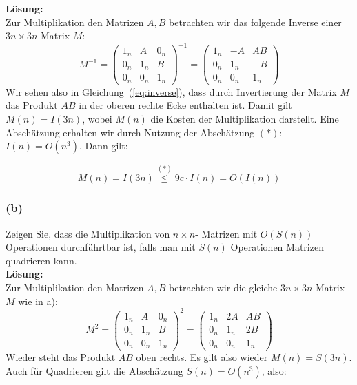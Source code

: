 \documentclass[11pt,a4paper,ngerman]{article}
\begin{document}
\textbf{Lösung:}\\
Zur Multiplikation den Matrizen $A,B$ betrachten wir das folgende Inverse einer $3n \times 3n$-Matrix $M$:
\begin{equation}\label{eq:inverse}
  M^{-1} = \left(\begin{array}{ccc}
              1_n & A   & 0_n \\
              0_n & 1_n & B \\
              0_n & 0_n & 1_n
           \end{array}\right)^{-1}
         = \left(\begin{array}{ccc}
              1_n & -A   & AB \\
              0_n & 1_n & -B \\
              0_n & 0_n & 1_n
           \end{array}\right)
\end{equation}
Wir sehen also in Gleichung~(\ref{eq:inverse}), dass durch Invertierung der Matrix $M$ das Produkt $AB$
in der oberen rechte Ecke enthalten ist. Damit gilt $M(n) = I(3n)$, wobei $M(n)$ die Kosten der Multiplikation
darstellt.
Eine Abschätzung erhalten wir durch Nutzung der Abschätzung $(*)$: $I(n) = O(n^3)$. Dann gilt:

\begin{equation}
  M(n) = I(3n) \stackrel{(*)}{\leq} 9c\cdot I(n) = O(I(n))
\end{equation}
\subsubsection*{(b)}

Zeigen Sie, dass die Multiplikation von $n \times n$- Matrizen mit $O(S(n))$ Operationen durchführtbar ist, falls man mit $S(n)$ Operationen Matrizen quadrieren kann.\\

\textbf{Lösung:}\\
Zur Multiplikation den Matrizen $A,B$ betrachten wir die gleiche $3n \times 3n$-Matrix $M$ wie in a):
\begin{equation}\label{eq:square}
  M^{2} = \left(\begin{array}{ccc}
              1_n & A   & 0_n \\
              0_n & 1_n & B \\
              0_n & 0_n & 1_n
           \end{array}\right)^{2}
         = \left(\begin{array}{ccc}
              1_n & 2A   & AB \\
              0_n & 1_n & 2B \\
              0_n & 0_n & 1_n
           \end{array}\right)
\end{equation}
Wieder steht das Produkt $AB$ oben rechts. Es gilt also wieder $M(n) = S(3n)$. Auch für Quadrieren gilt
die Abschätzung $S(n) = O(n^3)$, also:
\end{document}
